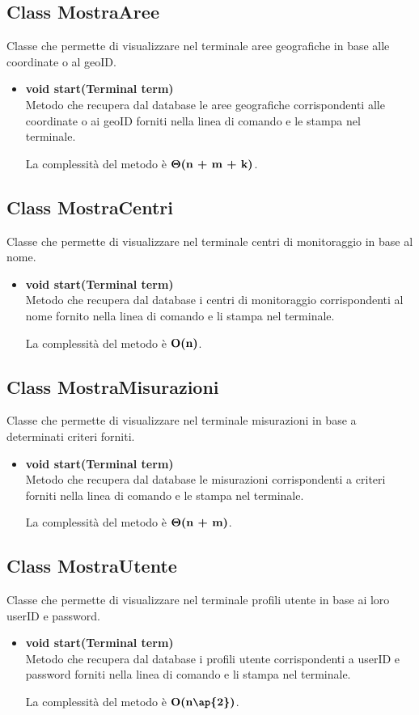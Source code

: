 \documentclass[a4paper, 12pt]{scrreprt}
\begin{document}
			\subsection{Class MostraAree}
			Classe che permette di visualizzare nel terminale aree geografiche in base alle coordinate o al geoID.
			\begin{itemize}
				\item \textbf{void start(Terminal term)}
				\\Metodo che recupera dal database le aree geografiche corrispondenti alle coordinate o ai geoID forniti nella linea di comando e le stampa nel terminale.

				La complessit\`a del metodo \`e $\mathbf{\Theta}\textbf{(n + m + k)}$.

			\end{itemize}

			\subsection{Class MostraCentri}
			Classe che permette di visualizzare nel terminale centri di monitoraggio in base al nome.
			\begin{itemize}
				\item \textbf{void start(Terminal term)}
				\\Metodo che recupera dal database i centri di monitoraggio corrispondenti al nome fornito nella linea di comando e li stampa nel terminale.

				La complessit\`a del metodo \`e $\mathbf{O}\textbf{(n)}$.

			\end{itemize}

			\subsection{Class MostraMisurazioni}
			Classe che permette di visualizzare nel terminale misurazioni in base a determinati criteri forniti.
			\begin{itemize}
				\item \textbf{void start(Terminal term)}
				\\Metodo che recupera dal database le misurazioni corrispondenti a criteri forniti nella linea di comando e le stampa nel terminale.

				La complessit\`a del metodo \`e $\mathbf{\Theta}\textbf{(n + m)}$.

			\end{itemize}
			\subsection{Class MostraUtente}
			Classe che permette di visualizzare nel terminale profili utente in base ai loro userID e password.
			\begin{itemize}
				\item \textbf{void start(Terminal term)}
				\\Metodo che recupera dal database i profili utente corrispondenti a userID e password  forniti nella linea di comando e li stampa nel terminale.

				La complessit\`a del metodo \`e $\bigO\textbf{(n\ap{2})}$.

			\end{itemize}
\end{document}
